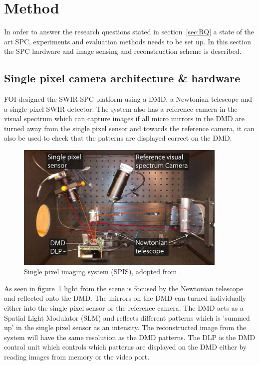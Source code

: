 \section{Method}
In order to answer the research questions stated in section~\ref{sec:RQ} a state of the art SPC, experiments and evaluation methods needs to be set up. In this section the SPC hardware and image sensing and reconstruction scheme is described.


\subsection{Single pixel camera architecture \& hardware}
\label{sec:system}
FOI designed the SWIR SPC platform using a DMD, a Newtonian telescope and a single pixel SWIR detector. The system also has a reference camera in the visual spectrum  which can capture images if all micro mirrors in the DMD are turned away from the single pixel sensor and towards the reference camera, it can also be used to check that the patterns are displayed correct on the DMD.  

\begin{figure}[H]
    \centering
    \includegraphics[width = 0.9\textwidth]{gfx/SPC.png}
    \caption{Single pixel imaging system (SPIS), adopted from \cite{article:foiSPIS}.}
    \label{fig:system1}
\end{figure}



As seen in figure~\ref{fig:system1} light from the scene is focused by the Newtonian telescope and reflected onto the DMD. The mirrors on the DMD can turned individually either into the single pixel sensor or the reference camera. The DMD acts as a Spatial Light Modulator (SLM) and reflects different patterns which is 'summed up' in the single pixel sensor as an intensity. The reconstructed image from the system will have the same resolution as the DMD patterns. The DLP is the DMD control unit which controls which patterns are displayed on the DMD either by reading images from memory or the video port.   


